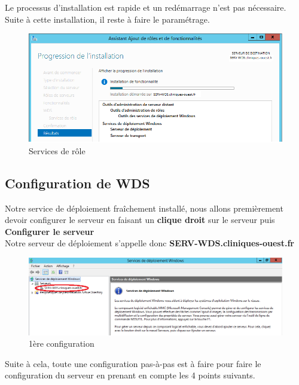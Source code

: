 \documentclass[11pt,a4paper,oneside]{article}
\begin{document}
Le processus d'installation est rapide et un redémarrage n'est pas nécessaire. Suite à cette installation, il reste à faire le paramétrage.

\begin{figure}[hbtp]
\centering
\includegraphics[scale=0.7]{Pictures/Installation/InstallWDS4.png}
\caption{\label{etiquette} Services de rôle}
\end{figure}
\newpage

\subsection{Configuration de WDS}

Notre service de déploiement fraîchement installé, nous allons premièrement devoir configurer le serveur en faisant un \textbf{clique droit} sur le serveur puis \textbf{Configurer le serveur}\\

Notre serveur de déploiement s'appelle donc \textbf{SERV-WDS.cliniques-ouest.fr}

\begin{figure}[hbtp]
\centering
\includegraphics[scale=0.68]{Pictures/Configuration/Conf1.png}
\caption{\label{etiquette} 1ère configuration}
\end{figure}

Suite à cela, toute une configuration pas-à-pas est à faire pour faire le configuration du serveur en prenant en compte les 4 points suivants.
\end{document}
